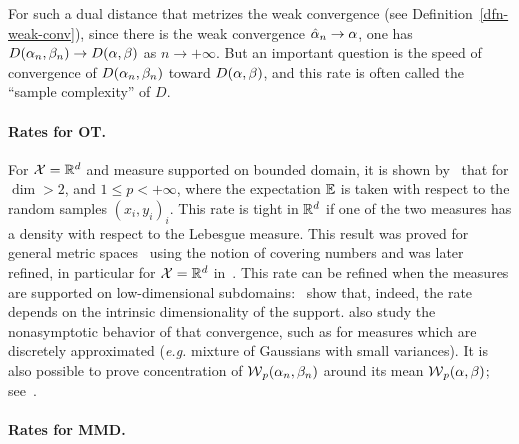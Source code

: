 For such a dual distance that metrizes the weak convergence (see Definition~\ref{dfn-weak-conv}), since there is the weak convergence $\hat{\alpha}_n \rightarrow \alpha$, one has $D(\alpha_n,\beta_n) \rightarrow D(\alpha,\beta)$ as $n \rightarrow +\infty$.
%
But an important question is the speed of convergence of $D(\alpha_n,\beta_n)$ toward $D(\alpha,\beta)$, and this rate is often called the ``sample complexity'' of $D$. 


\paragraph{Rates for OT.}

For $\mathcal{X}=\mathbb{R}^d$ and measure supported on bounded domain, it is shown by~\cite{dudley1969speed} that for $\dim>2$, and $1 \leq p < +\infty$,  
where the expectation $\mathbb{E}$ is taken with respect to the random samples $(x_i,y_i)_i$. This rate is tight in $\mathbb{R}^d$ if one of the two measures has a density with respect to the Lebesgue measure. This result was proved for general metric spaces~\cite{dudley1969speed} using the notion of covering numbers and was later refined, in particular for $\mathcal{X}=\mathbb{R}^d$ in~\cite{dereich2013constructive,fournier2015rate}. 
This rate can be refined when the measures are supported on low-dimensional subdomains:~\cite{weed2017sharp} show that, indeed, the rate depends on the intrinsic dimensionality of the support. \cite{weed2017sharp} also study the nonasymptotic behavior of that convergence, such as for measures which are discretely approximated (\emph{e.g.} mixture of Gaussians with small variances).
%
It is also possible to prove concentration of $\operatorname{\mathcal{W}}_p(\alpha_n,\beta_n)$ around its mean $\operatorname{\mathcal{W}}_p(\alpha,\beta)$; see~\cite{bolley2007quantitative,boissard2011simple,weed2017sharp}.

\paragraph{Rates for MMD.}

